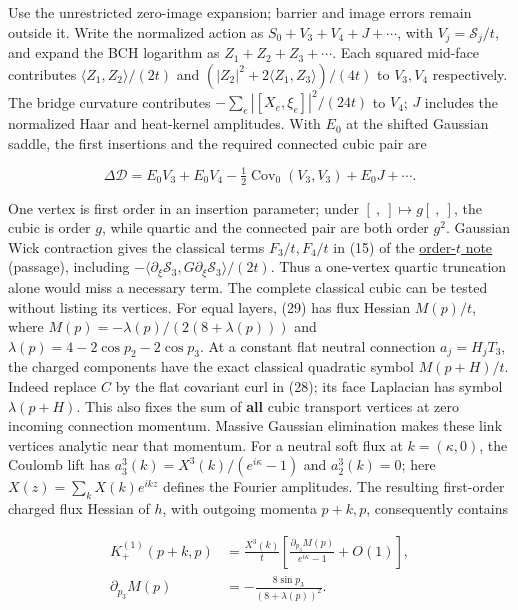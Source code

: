 \documentclass[11pt,a4paper]{article}
\begin{document}
Use the unrestricted zero-image expansion; barrier and image errors
remain outside it. Write the normalized action as
\(S_0+V_3+V_4+J+\cdots\), with \(V_j=\mathcal S_j/t\), and expand the
BCH logarithm as \(Z_1+Z_2+Z_3+\cdots\). Each squared mid-face
contributes \(\langle Z_1,Z_2\rangle/(2t)\) and
\((|Z_2|^2+2\langle Z_1,Z_3\rangle)/(4t)\) to \(V_3,V_4\) respectively.
The bridge curvature contributes \(-\sum_e|[X_e,\xi_e]|^2/(24t)\) to
\(V_4\); \(J\) includes the normalized Haar and heat-kernel amplitudes.
With \(E_0\) at the shifted Gaussian saddle, the first insertions and
the required connected cubic pair are

\[\Delta\mathcal D=E_0V_3+E_0V_4
-\tfrac12\operatorname{Cov}_0(V_3,V_3)+E_0J+\cdots.\tag{31}\]

One vertex is first order in an insertion parameter; under
\([\ ,\ ]\mapsto g[\ ,\ ]\), the cubic is order \(g\), while quartic and
the connected pair are both order \(g^2\). Gaussian Wick contraction
gives the classical terms \(F_3/t,F_4/t\) in (15) of the
\href{su2-midplane-order-t.md}{order-\(t\) note} (passage), including
\(-\langle\partial_\xi\mathcal S_3,G\partial_\xi\mathcal S_3\rangle/(2t)\).
Thus a one-vertex quartic truncation alone would miss a necessary term.
The complete classical cubic can be tested without listing its vertices.
For equal layers, (29) has flux Hessian \(M(p)/t\), where
\(M(p)=-\lambda(p)/(2(8+\lambda(p)))\) and
\(\lambda(p)=4-2\cos p_2-2\cos p_3\). At a constant flat neutral
connection \(a_j=H_jT_3\), the charged components have the exact
classical quadratic symbol \(M(p+H)/t\). Indeed replace \(C\) by the
flat covariant curl in (28); its face Laplacian has symbol
\(\lambda(p+H)\). This also fixes the sum of \textbf{all} cubic
transport vertices at zero incoming connection momentum. Massive
Gaussian elimination makes these link vertices analytic near that
momentum. For a neutral soft flux at \(k=(\kappa,0)\), the Coulomb lift
has \(a_3^3(k)=X^3(k)/(e^{i\kappa}-1)\) and \(a_2^3(k)=0\); here
\(X(z)=\sum_k X(k)e^{ikz}\) defines the Fourier amplitudes. The
resulting first-order charged flux Hessian of \(h\), with outgoing
momenta \(p+k,p\), consequently contains

\[\begin{aligned}
K^{(1)}_{+}(p+k,p)
&=\frac{X^3(k)}t
 \left[\frac{\partial_{p_3}M(p)}{e^{i\kappa}-1}+O(1)\right],\\
\partial_{p_3}M(p)&=-\frac{8\sin p_3}{(8+\lambda(p))^2}.
\end{aligned}\tag{32}\]
\end{document}
